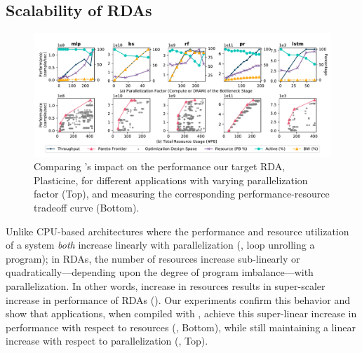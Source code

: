 
\subsection{Scalability of RDAs}
\label{ssec:scalability}

\begin{figure}
\centering
  \includegraphics[width=1\textwidth]{figures/par.pdf}
  \vspace{-20pt}
  \caption{Comparing \name{}'s impact on the performance our target RDA, Plasticine, for different applications with varying parallelization factor (Top), and measuring the corresponding performance-resource tradeoff curve (Bottom).}
  \label{fig:scalability}
\end{figure}

Unlike CPU-based architectures where the performance and resource utilization of a system {\em both} increase linearly with parallelization (\eg, loop unrolling a program); in RDAs, the number of resources increase sub-linearly or quadratically---depending upon the degree of program imbalance---with parallelization.
In other words, increase in resources results in super-scaler increase in performance of RDAs ().
Our experiments confirm this behavior and show that applications, when compiled with \name{}, achieve this super-linear increase in performance with respect to resources (, Bottom), while still maintaining a linear increase with respect to parallelization (, Top).   

